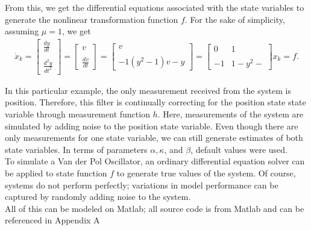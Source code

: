 \noindent From this, we get the differential equations associated with the state variables to generate the nonlinear transformation function $f$. For the sake of simplicity, assuming $\mu = 1$, we get
\begin{align*}
\dot x_k  = 
	\begin{bmatrix}
           \frac{dy}{dt}  \\ \\
           \frac{d^2y}{dt^2} 
           \end{bmatrix} = 
           \begin{bmatrix}
          v \\ \\
           \frac{dv}{dt} 
           \end{bmatrix}  =
           \begin{bmatrix}
           v \\ \\
           -1 (y^2 - 1)v - y 
           \end{bmatrix}=
           \begin{bmatrix}
           0 & 1 \\ \\
           -1& 1- y^2 - 
           \end{bmatrix} x_k 
           =
           f.
\end{align*}


\noindent In this particular example, the only measurement received from the system is position. Therefore, this filter is continually correcting for the position state state variable through measurement function $h$. Here, measurements of the system are simulated by adding noise to the position state variable. Even though there are only measurements for one state variable, we can still generate estimates of both state variables. In terms of parameters $\alpha, \kappa$, and $\beta$, default values were used.\\ 

\noindent To simulate a Van der Pol Oscillator, an ordinary differential equation solver can be applied to state function $f$ to generate true values of the system. Of course, systems do not perform perfectly; variations in model performance can be captured by randomly adding noise to the system. \\

\noindent All of this can be modeled on Matlab; all source code is from Matlab and can be referenced in Appendix A \cite{matlab /& simulink}

